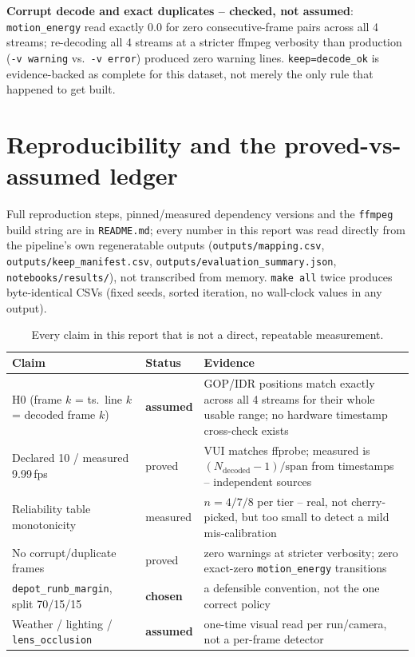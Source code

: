 \documentclass[11pt,a4paper]{article}
\begin{document}
\textbf{Corrupt decode and exact duplicates -- checked, not assumed}: \texttt{motion\_energy} read
exactly 0.0 for zero consecutive-frame pairs across all 4 streams; re-decoding all 4 streams at a
stricter ffmpeg verbosity than production (\texttt{-v warning} vs.\ \texttt{-v error}) produced
zero warning lines. \texttt{keep=decode\_ok} is evidence-backed as complete for this dataset, not
merely the only rule that happened to get built.

\section{Reproducibility and the proved-vs-assumed ledger}
\label{sec:ledger}

Full reproduction steps, pinned/measured dependency versions and the \texttt{ffmpeg} build string
are in \texttt{README.md}; every number in this report was read directly from the pipeline's own
regeneratable outputs (\texttt{outputs/mapping.csv}, \texttt{outputs/keep\_manifest.csv},
\texttt{outputs/evaluation\_summary.json}, \texttt{notebooks/results/}), not transcribed from
memory. \texttt{make all} twice produces byte-identical CSVs (fixed seeds, sorted iteration, no
wall-clock values in any output).

\begin{table}[H]
  \centering\footnotesize
  \begin{tabular}{p{}p{}p{}}
    \toprule
    Claim & Status & Evidence \\
    \midrule
    H0 (frame $k$ = ts.\ line $k$ = decoded frame $k$) & \textbf{assumed}
      & GOP/IDR positions match exactly across all 4 streams for their whole usable range; no
      hardware timestamp cross-check exists \\
    Declared 10 / measured 9.99\,fps & proved & VUI matches ffprobe; measured is
      $(N_{\mathrm{decoded}}{-}1)/\mathrm{span}$ from timestamps -- independent sources \\
    Reliability table monotonicity & measured & $n=4/7/8$ per tier -- real, not
      cherry-picked, but too small to detect a mild mis-calibration \\
    No corrupt/duplicate frames & proved & zero warnings at stricter verbosity; zero
      exact-zero \texttt{motion\_energy} transitions \\
    \texttt{depot\_runb\_margin}, split 70/15/15 & \textbf{chosen} & a defensible
      convention, not the one correct policy \\
    Weather / lighting / \texttt{lens\_occlusion} & \textbf{assumed} & one-time
      visual read per run/camera, not a per-frame detector \\
    \bottomrule
  \end{tabular}
  \caption{Every claim in this report that is not a direct, repeatable measurement.}
  \label{tab:ledger}
\end{table}
\end{document}
